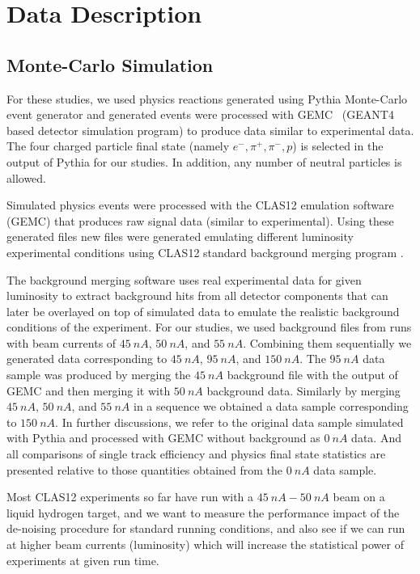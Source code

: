 \section{Data Description}

\subsection{Monte-Carlo Simulation}

For these studies, we used physics reactions generated using Pythia Monte-Carlo~\cite{Pythia:2022} event generator and generated events were processed with GEMC~\cite{gemc:2022} (GEANT4~\cite{geant4:2022} based detector simulation program) to produce data similar to experimental data. The four charged particle final state (namely $e^-,\pi^+,\pi^-,p$) is selected in the output of Pythia for our studies.
In addition, any number of neutral particles is allowed.

Simulated physics events were processed with the CLAS12 emulation software (GEMC) that produces raw signal data (similar to experimental).
Using these generated files new files were generated emulating different luminosity experimental conditions using CLAS12 standard background merging program \cite{Stepanyan:2020bg}. 

The background merging software uses real experimental data for given luminosity to extract background hits from all detector components that can later be overlayed on top of simulated data to emulate the realistic background conditions of the experiment. For our studies, we used background files from runs with beam currents of $45~nA$, $50~nA$, and $55~nA$. Combining them sequentially we generated data corresponding to $45~nA$, $95~nA$, and $150~nA$. The $95~nA$ data sample was produced by merging the $45~nA$ background file with the output of GEMC and then merging it with $50~nA$ background data. Similarly by merging $45~nA$, $50~nA$, and $55~nA$ in a sequence we obtained a data sample corresponding to $150~nA$. In further discussions, we refer to the original data sample simulated with Pythia and processed with GEMC without background as $0~nA$ data. And all comparisons of single track efficiency and physics final state statistics 
are presented relative to those quantities obtained from the $0~nA$ data sample.

Most CLAS12 experiments so far have run with a $45~nA-50~nA$ beam on a liquid hydrogen target, and we want to measure the performance impact of the de-noising procedure for standard running conditions, and also see if we can run at higher beam currents (luminosity) which will increase the statistical power of experiments at given run time.

